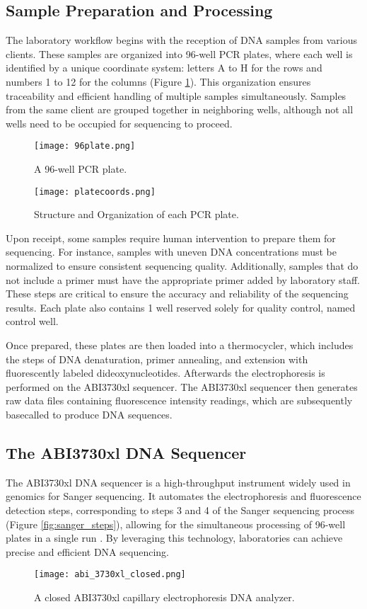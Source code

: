 \subsection{Sample Preparation and Processing}
The laboratory workflow begins with the reception of DNA samples from various clients. These samples are organized into 96-well PCR plates, where each well is identified by a unique coordinate system: letters A to H for the rows and numbers 1 to 12 for the columns (Figure \ref{fig:96_well_plate}). This organization ensures traceability and efficient handling of multiple samples simultaneously. Samples from the same client are grouped together in neighboring wells, although not all wells need to be occupied for sequencing to proceed.
\begin{figure}[H]
  \centering
  \texttt{[image: 96plate.png]}
  \caption{A 96-well PCR plate.}
  \label{fig:96_well_plate}
\end{figure}


\begin{figure}[H]
  \centering
  \texttt{[image: platecoords.png]}
  \caption{Structure and Organization of each PCR plate.}
  \label{fig:platecoords}
\end{figure}

Upon receipt, some samples require human intervention to prepare them for sequencing. For instance, samples with uneven DNA concentrations must be normalized to ensure consistent sequencing quality. Additionally, samples that do not include a primer must have the appropriate primer added by laboratory staff. These steps are critical to ensure the accuracy and reliability of the sequencing results. Each plate also contains 1 well reserved solely for quality control, named control well.

Once prepared, these plates are then loaded into a thermocycler, which includes the steps of DNA denaturation, primer annealing, and extension with fluorescently labeled dideoxynucleotides. Afterwards the electrophoresis is performed on the ABI3730xl sequencer. The ABI3730xl sequencer then generates raw data files containing fluorescence intensity readings, which are subsequently basecalled to produce DNA sequences.


\subsection{The ABI3730xl DNA Sequencer}
The ABI3730xl DNA sequencer is a high-throughput instrument widely used in genomics for Sanger sequencing. It automates the electrophoresis and fluorescence detection steps, corresponding to steps 3 and 4 of the Sanger sequencing process (Figure \ref{fig:sanger_steps}), allowing for the simultaneous processing of 96-well plates in a single run \cite{smith_capillary_sequencing,abi3730xl_overview}. By leveraging this technology, laboratories can achieve precise and efficient DNA sequencing. 
\begin{figure}[h]
\centering
\texttt{[image: abi\_3730xl\_closed.png]}
\caption{A closed ABI3730xl capillary electrophoresis DNA analyzer.}
\label{fig:abi_3730xl_closed}
\end{figure}


